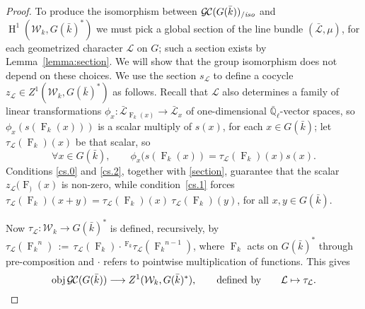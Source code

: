 \documentclass[11pt]{amsart}
\theoremstyle{plain}
\theoremstyle{definition}
\theoremstyle{remark}
\newcommand{\EE}{\mathbb{\bar Q}_\ell}
\newcommand{\bFq}{\bar{k}}
\newcommand{\Fq}{k}
\newcommand{\Frob}[1]{{\operatorname{F}_{#1}}}
\DeclareMathOperator{\Hh}{H}
\newcommand{\ceq}{{\, :=\, }}
\newcommand{\obj}{{\text{obj}\, }}
\newcommand{\cs}[1]{{\mathcal{#1}}}
\newcommand{\gcs}[1]{{\mathcal{\bar #1}}}
\newcommand{\GC}{{\mathcal{G\hskip-0.8pt C}}}
\newcommand{\GCiso}[1]{\GC(#1)_{/\textit{iso}}}
\newcommand{\Weil}[1]{\mathcal{W}_{#1}}
\newcommand\Clifton[1]{\marginpar{\smaller\smaller CC: #1}}
\begin{document}
\begin{proof}
  To produce the isomorphism between $\GCiso{G(\bFq)}$ and
  $\Hh^1(\Weil{\Fq}, G(\bFq)^*)$ we must pick a global section of the line
  bundle $(\gcs{L},\mu)$, for each geometrized character $\cs{L}$ on $G$; 
  such a section exists by Lemma~\ref{lemma:section}.
  We will show that the group isomorphism does not depend on these
  choices.
%
  We use the section $s_\cs{L}$ to define a cocycle $z_\cs{L} \in Z^1(\Weil{\Fq},G(\bFq)^*)$
  as follows. Recall that $\cs{L}$ also determines a family of linear transformations
  $\phi_x : \gcs{L}_{\Frob{\Fq}(x)} \to \gcs{L}_x$ of one-dimensional $\EE$-vector
  spaces, so $\phi_x(s(\Frob{\Fq}(x)))$ is a scalar multiply of $s(x)$, for
  each $x\in G(\bFq)$; let $\tau_\cs{L}(\Frob{\Fq})(x)$ be that scalar, so
  \begin{equation}\label{t}
    \forall x\in G(\bFq),\qquad \phi_{x}(s(\Frob{\Fq}(x)) = \tau_\cs{L}(\Frob{\Fq})(x) s(x).
  \end{equation}
  Conditions \ref{cs.0} and \ref{cs.2}, together with \eqref{section}, guarantee that
  the scalar $z_\cs{L}(\Frob)(x)$ is non-zero, while condition~\ref{cs.1} forces
  $\tau_\cs{L}(\Frob{\Fq})(x+y) = \tau_\cs{L}(\Frob{\Fq})(x) \ \tau_\cs{L}(\Frob{\Fq})(y)$,
  for all $x,y \in G(\bFq)$.

  Now $\tau_\cs{L} : \Weil{\Fq} \to G(\bFq)^*$ is defined, recursively, by
  $\tau_\cs{L}(\Frob{\Fq}^n) \ceq \tau_\cs{L}(\Frob{\Fq})\cdot \,^\Frob{\Fq} \tau_\cs{L}(\Frob{\Fq}^{n-1})$,
  where $\Frob{\Fq}$ acts on $G(\bFq)^*$ through pre-composition and $\cdot$ refers
  to pointwise multiplication of functions. This gives
  \[
  \obj \GC(G(\bFq)) \longrightarrow Z^1(\Weil{\Fq},G(\bFq)^*),
  \qquad \text{defined by} \qquad \cs{L} \mapsto \tau_\cs{L}.
  \]


\end{proof}
\end{document}
